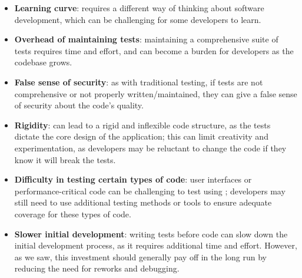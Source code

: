 \begin{itemize}
    \item \textbf{Learning curve}: \tdd requires a different way of thinking about software development, which can be challenging for some developers to learn.
    \item \textbf{Overhead of maintaining tests}: maintaining a comprehensive suite of tests requires time and effort, and can become a burden for developers as the codebase grows. 
    \item \textbf{False sense of security}: as with traditional testing, if tests are not comprehensive or not properly written/maintained, they can give a false sense of security about the code's quality.
    \item \textbf{Rigidity}: \tdd can lead to a rigid and inflexible code structure, as the tests dictate the core design of the application; this can limit creativity and experimentation, as developers may be reluctant to change the code if they know it will break the tests.
    \item \textbf{Difficulty in testing certain types of code}: user interfaces or performance-critical code can be challenging to test using \tdd; developers may still need to use additional testing methods or tools to ensure adequate coverage for these types of code.
    \item \textbf{Slower initial development}: writing tests before code can slow down the initial development process, as it requires additional time and effort. However, as we saw, this investment should generally pay off in the long run by reducing the need for reworks and debugging.
\end{itemize}

